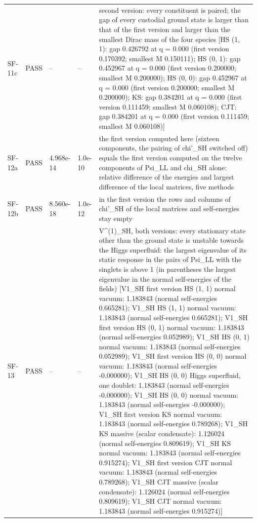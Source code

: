 \documentclass[aps,prd,onecolumn,superscriptaddress,nofootinbib,floatfix,longbibliography]{revtex4-2}
\begin{document}
\begin{longtable}{p{}p{}p{}p{}p{}}
SF-11c & PASS & -- & -- & second version: every constituent is paired; the gap of every custodial ground state is larger than that of the first version and larger than the smallest Dirac mass of the four species [HS (1, 1): gap 0.426792 at \textbar{}q\textbar{} = 0.000 (first version 0.170392; smallest \textbar{}M\textbar{} 0.150111); HS (0, 1): gap 0.452967 at \textbar{}q\textbar{} = 0.000 (first version 0.200000; smallest \textbar{}M\textbar{} 0.200000); HS (0, 0): gap 0.452967 at \textbar{}q\textbar{} = 0.000 (first version 0.200000; smallest \textbar{}M\textbar{} 0.200000); KS: gap 0.384201 at \textbar{}q\textbar{} = 0.000 (first version 0.111459; smallest \textbar{}M\textbar{} 0.060108); CJT: gap 0.384201 at \textbar{}q\textbar{} = 0.000 (first version 0.111459; smallest \textbar{}M\textbar{} 0.060108)] \\
SF-12a & PASS & 4.968e-14 & 1.0e-10 & the first version computed here (sixteen components, the pairing of chi'\_SH switched off) equals the first version computed on the twelve components of Psi\_LL and chi\_SH alone: relative difference of the energies and largest difference of the local matrices, five methods \\
SF-12b & PASS & 8.560e-18 & 1.0e-12 & in the first version the rows and columns of chi'\_SH of the local matrices and self-energies stay empty \\
SF-13 & PASS & -- & -- & V\textasciicircum{}(1)\_SH, both versions: every stationary state other than the ground state is unstable towards the Higgs superfluid: the largest eigenvalue of its static response in the pairs of Psi\_LL with the singlets is above 1 (in parentheses the largest eigenvalue in the normal self-energies of the fields) [V1\_SH first version HS (1, 1) normal vacuum: 1.183843 (normal self-energies 0.665281); V1\_SH HS (1, 1) normal vacuum: 1.183843 (normal self-energies 0.665281); V1\_SH first version HS (0, 1) normal vacuum: 1.183843 (normal self-energies 0.052989); V1\_SH HS (0, 1) normal vacuum: 1.183843 (normal self-energies 0.052989); V1\_SH first version HS (0, 0) normal vacuum: 1.183843 (normal self-energies -0.000000); V1\_SH HS (0, 0) Higgs superfluid, one doublet: 1.183843 (normal self-energies -0.000000); V1\_SH HS (0, 0) normal vacuum: 1.183843 (normal self-energies -0.000000); V1\_SH first version KS normal vacuum: 1.183843 (normal self-energies 0.789268); V1\_SH KS massive (scalar condensate): 1.126024 (normal self-energies 0.809619); V1\_SH KS normal vacuum: 1.183843 (normal self-energies 0.915274); V1\_SH first version CJT normal vacuum: 1.183843 (normal self-energies 0.789268); V1\_SH CJT massive (scalar condensate): 1.126024 (normal self-energies 0.809619); V1\_SH CJT normal vacuum: 1.183843 (normal self-energies 0.915274)] \\
\end{longtable}
\endgroup
\end{document}

